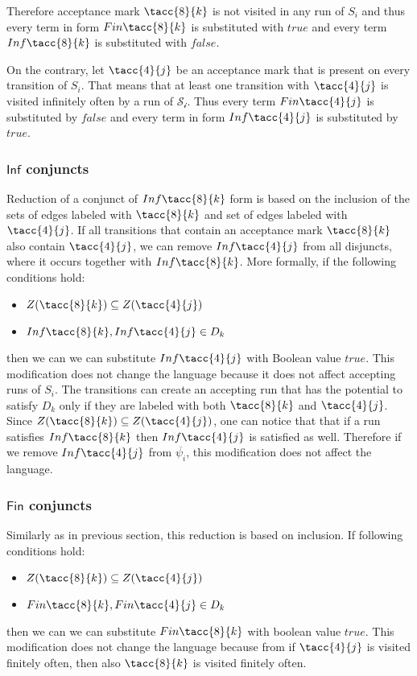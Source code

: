 \documentclass[a4paper,UKenglish,cleveref, autoref, thm-restate]{lipics-v2021}
\def\Inf{\ensuremath{\mathsf{Inf}}}
\def\Fin{\ensuremath{\mathsf{Fin}}}
\def\false{\mathit{false}}
\def\true{\mathit{true}}
\begin{document}
Therefore acceptance mark $\tacc{8}{k}$ is not visited in any run of $S_{i}$ and thus every term in form $\Fin\tacc{8}{k}$ is substituted with $\true$ and every term $\Inf\tacc{8}{k}$ is substituted with $\false$.

On the contrary, let $\tacc{4}{j}$ be an acceptance mark that is present on every transition of $S_{i}$. That means that at least one transition with $\tacc{4}{j}$ is visited infinitely often by a run of $\mathcal{S_{i}}$. Thus every term $\Fin\tacc{4}{j}$ is substituted by $\false$ and every term in form $\Inf\tacc{4}{j}$ is substituted by $\true$. 

\subsubsection{$\Inf$ conjuncts\\}
\label{subsection:simpl_inf}
Reduction of a conjunct of $\Inf\tacc{8}{k}$ form  is based on the inclusion of the sets of edges labeled with $\tacc{8}{k}$ and set of edges labeled with $\tacc{4}{j}$. If all transitions that contain an acceptance mark $\tacc{8}{k}$ also contain $\tacc{4}{j}$, we can remove $\Inf\tacc{4}{j}$ from all disjuncts, where it occurs together with $\Inf\tacc{8}{k}$. 
More formally, if the following conditions hold:
\begin{itemize}
    \item $Z(\tacc{8}{k}) \subseteq Z(\tacc{4}{j})$
    \item $\Inf\tacc{8}{k}, \Inf\tacc{4}{j} \in D_{k}$
\end{itemize}
then we can we can substitute $\Inf\tacc{4}{j}$ with Boolean value $\true$. 
This modification does not change the language because it does not affect accepting runs of $S_{i}$. The transitions can create an accepting run that has the potential to satisfy $D_{k}$ only if they are labeled with both  $\tacc{8}{k}$  and $\tacc{4}{j}$. Since $Z(\tacc{8}{k}) \subseteq Z(\tacc{4}{j})$, one can notice that that if a run satisfies $\Inf\tacc{8}{k}$ then  $\Inf\tacc{4}{j}$ is satisfied as well. Therefore if we remove $\Inf \tacc{4}{j}$ from $\overline{\psi_{i}}$, this modification does not affect the language.

\subsubsection{$\Fin$ conjuncts\\}
Similarly as in previous section, this reduction is based on inclusion.
If following conditions hold:
\begin{itemize}
    \item $Z(\tacc{8}{k}) \subseteq Z(\tacc{4}{j})$
    \item $\Fin\tacc{8}{k}, \Fin\tacc{4}{j} \in D_{k}$
\end{itemize}
then we can we can substitute $\Fin\tacc{8}{k}$ with boolean value $\true$. This modification does not change the language because from if $\tacc{4}{j}$ is visited finitely often, then also $\tacc{8}{k}$ is visited finitely often. 
\medskip
\end{document}
